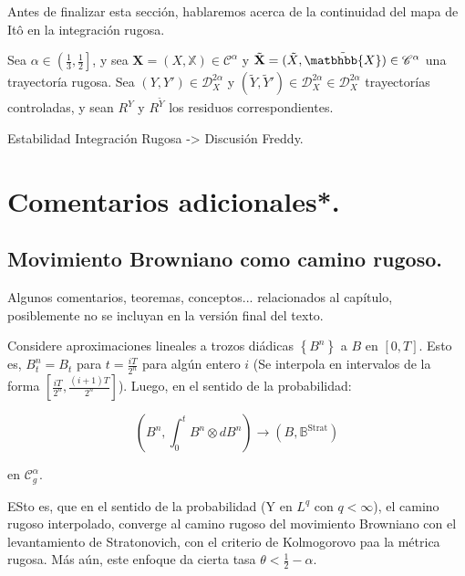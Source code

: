 Antes de finalizar esta sección, hablaremos acerca de la continuidad del mapa de Itô en la integración rugosa.

\begin{coro}
	Sea $\alpha \in \left( \frac{1}{3}, \frac{1}{2} \right]$, y sea $\mathbf{X} = (X, \mathbb{X}) \in \mathscr{C}^{\alpha}$ y $\tilde{  \mathbf{X} } = (\tilde{X}, \tilde{ \matbhbb{X} }) \in \mathscr{C}^{\alpha}$ una trayectoría rugosa. Sea $(Y, Y') \in \mathscr{D}_X^{2 \alpha}$ y $(\tilde{Y}, \tilde{Y}') \in \mathscr{D}_X^{2 \alpha} \in \mathscr{D}_X^{2\alpha}$ trayectorías controladas, y sean $R^Y$ y $R^{\tilde{Y}}$ los residuos correspondientes. 
\end{coro}


Estabilidad Integración Rugosa -> Discusión Freddy.
















\section{Comentarios adicionales*.}

\subsection{Movimiento Browniano como camino rugoso.}

Algunos comentarios, teoremas, conceptos... relacionados al capítulo, posiblemente no se incluyan en la versión final del texto.

\begin{prop}
	Considere aproximaciones lineales a trozos diádicas $\left\{ B^{n} \right\}$ a $B$ en $[0,T]$. Esto es, $B_t^n = B_t$ para $t = \frac{iT}{2^n}$ para algún entero $i$ (Se interpola en intervalos de la forma $\left[ \frac{iT}{2^n}, \frac{(i+1)T}{2^n} \right]$). Luego, en el sentido de la probabilidad:

	\[
		\left( B^n, \int_0^t B^n \otimes dB^n \right) \rightarrow (B, \mathbb{B}^{\text{Strat}})
	\]

	en $\mathcal{C}^{\alpha}_g$.

\end{prop}

ESto es, que en el sentido de la probabilidad (Y en $L^q$ con $q < \infty$), el camino rugoso interpolado, converge al camino rugoso del movimiento Browniano con el levantamiento de Stratonovich, con el criterio de Kolmogorovo paa la métrica rugosa. Más aún, este enfoque da cierta tasa $\theta < \frac{1}{2} - \alpha$. 
 

